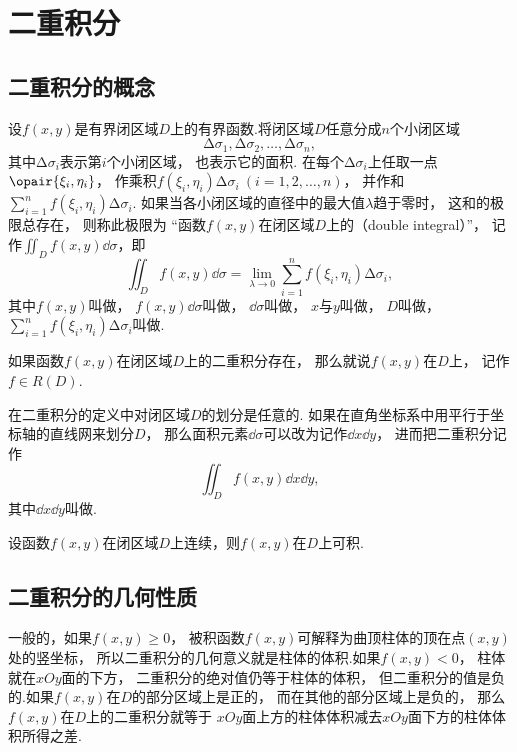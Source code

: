 \section{二重积分}
\subsection{二重积分的概念}
设\(f(x,y)\)是有界闭区域\(D\)上的有界函数.将闭区域\(D\)任意分成\(n\)个小闭区域\[
	\increment\sigma_1,\increment\sigma_2,\dotsc,\increment\sigma_n,
\]
其中\(\increment\sigma_i\)表示第\(i\)个小闭区域，
也表示它的面积.
在每个\(\increment\sigma_i\)上任取一点\(\opair{\xi_i,\eta_i}\)，
作乘积\(f(\xi_i,\eta_i) \increment\sigma_i\ (i=1,2,\dotsc,n)\)，
并作和\(\sum_{i=1}^n f(\xi_i,\eta_i) \increment\sigma_i\).
如果当各小闭区域的直径中的最大值\(\lambda\)趋于零时，
这和的极限总存在，
则称此极限为
“函数\(f(x,y)\)在闭区域\(D\)上的（double integral）”，
记作\(\iint_D f(x,y) \dd{\sigma}\)，即
\[
	\iint_D f(x,y) \dd{\sigma}
	= \lim_{\lambda\to0}
	\sum_{i=1}^n f(\xi_i,\eta_i) \increment\sigma_i,
\]
其中\(f(x,y)\)叫做，
\(f(x,y) \dd{\sigma}\)叫做，
\(\dd{\sigma}\)叫做，
\(x\)与\(y\)叫做，
\(D\)叫做，
\(\sum_{i=1}^n f(\xi_i,\eta_i) \increment\sigma_i\)叫做.

如果函数\(f(x,y)\)在闭区域\(D\)上的二重积分存在，
那么就说\(f(x,y)\)在\(D\)上，
记作\(f \in R(D)\).

在二重积分的定义中对闭区域\(D\)的划分是任意的.
如果在直角坐标系中用平行于坐标轴的直线网来划分\(D\)，
那么面积元素\(\dd{\sigma}\)可以改为记作\(\dd{x}\dd{y}\)，
进而把二重积分记作\[
	\iint_{D}{f(x,y)\dd{x}\dd{y}},
\]
其中\(\dd{x}\dd{y}\)叫做.

\begin{theorem}[充分条件]
设函数\(f(x,y)\)在闭区域\(D\)上连续，则\(f(x,y)\)在\(D\)上可积.
\end{theorem}

\subsection{二重积分的几何性质}
一般的，如果\(f(x,y) \geq 0\)，
被积函数\(f(x,y)\)可解释为曲顶柱体的顶在点\((x,y)\)处的竖坐标，
所以二重积分的几何意义就是柱体的体积.如果\(f(x,y) < 0\)，
柱体就在\(xOy\)面的下方，
二重积分的绝对值仍等于柱体的体积，
但二重积分的值是负的.如果\(f(x,y)\)在\(D\)的部分区域上是正的，
而在其他的部分区域上是负的，
那么\(f(x,y)\)在\(D\)上的二重积分就等于
\(xOy\)面上方的柱体体积减去\(xOy\)面下方的柱体体积所得之差.

